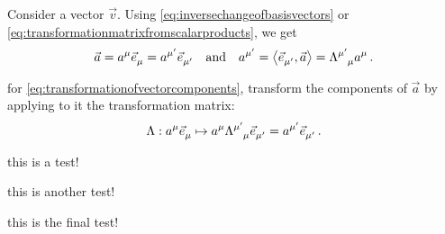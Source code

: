  Consider a vector $\vec v$. Using \cref{eq:inversechangeofbasisvectors} or \cref{eq:transformationmatrixfromscalarproducts}, we get
%
\begin{equation}\label{eq:transformationofvectorcomponents}
  \vec a = \tvec a\mu\tbvec\mu = \tvec a{\aidx\mu}\tbvec{\aidx\mu}\quad\text{and}\quad
  \tvec a{\aidx\mu} = \sprod{\tbvec{\aidx\mu}}{\vec a} = \ttransmat{\aidx\mu}{\mu}\tvec a\mu\,.
\end{equation}

 for \cref{eq:transformationofvectorcomponents}, transform the components of $\vec a$ by applying to it the transformation matrix:
%
\begin{equation*}
  \fdmap{\transmat}{\tvec a\mu\tbvec\mu}{\tvec a\mu\ttransmat{\aidx\mu}{\mu}\tbvec{\aidx\mu} = \tvec a{\aidx\mu}\tbvec{\aidx\mu}}\,.
\end{equation*}
%


this is a test!

this is another test!

this is the final test!




